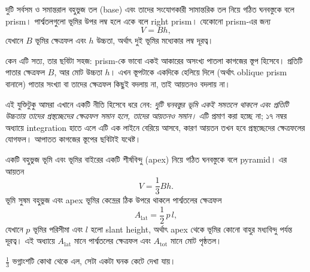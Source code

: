 \documentclass[11pt]{article}
\begin{document}
\begin{idea}[Prism]
দুটি সর্বসম ও সমান্তরাল বহুভুজ তল (base) এবং তাদের সংযোগকারী সামান্তরিক তল
নিয়ে গঠিত ঘনবস্তুকে বলে prism। পার্শ্বতলগুলো ভূমির উপর লম্ব হলে একে বলে right
prism। যেকোনো prism-এর জন্য
\[
  V = Bh ,
\]
যেখানে $B$ ভূমির ক্ষেত্রফল এবং $h$ উচ্চতা, অর্থাৎ দুই ভূমির মধ্যেকার লম্ব দূরত্ব।
\end{idea}

কেন এটি সত্য, তার ছবিটা সহজ: prism-কে ভাবো একই আকারের অসংখ্য পাতলা কাগজের
স্তূপ হিসেবে। প্রতিটি পাতার ক্ষেত্রফল $B$, আর মোট উচ্চতা $h$। এখন স্তূপটাকে
একদিকে হেলিয়ে দিলে (অর্থাৎ oblique prism বানালে) পাতার সংখ্যা বা তাদের ক্ষেত্রফল
কিছুই বদলায় না, তাই আয়তনও বদলায় না।

এই যুক্তিটুকু আমরা এখানে একটি নীতি হিসেবে ধরে নেব: \emph{দুটি ঘনবস্তুর ভূমি একই
সমতলে থাকলে এবং প্রতিটি উচ্চতায় তাদের প্রস্থচ্ছেদের ক্ষেত্রফল সমান হলে, তাদের
আয়তনও সমান।} এটি প্রমাণ করা হচ্ছে না; ১৭ নম্বর অধ্যায়ে integration হাতে এলে
এটি এক লাইনে বেরিয়ে আসবে, কারণ আয়তন তখন হবে প্রস্থচ্ছেদের ক্ষেত্রফলের যোগফল।
আপাতত কাগজের স্তূপের ছবিটাই যথেষ্ট।

\begin{idea}[Pyramid]
একটি বহুভুজ ভূমি এবং ভূমির বাইরের একটি শীর্ষবিন্দু (apex) নিয়ে গঠিত ঘনবস্তুকে
বলে pyramid। এর আয়তন
\[
  V = \frac{1}{3} Bh .
\]
ভূমি সুষম বহুভুজ এবং apex ভূমির কেন্দ্রের ঠিক উপরে থাকলে পার্শ্বতলের ক্ষেত্রফল
\[
  A_{\mathrm{lat}} = \frac{1}{2}\, p \, l ,
\]
যেখানে $p$ ভূমির পরিসীমা এবং $l$ হলো slant height, অর্থাৎ apex থেকে ভূমির কোনো
বাহুর মধ্যবিন্দু পর্যন্ত দূরত্ব। এই অধ্যায়ে $A_{\mathrm{lat}}$ মানে
পার্শ্বতলের ক্ষেত্রফল এবং $A_{\mathrm{tot}}$ মানে মোট পৃষ্ঠতল।
\end{idea}

$\tfrac{1}{3}$ ভগ্নাংশটি কোথা থেকে এল, সেটা একটা ঘনক কেটে দেখা যায়।

\begin{center}
\end{center}
\end{document}
